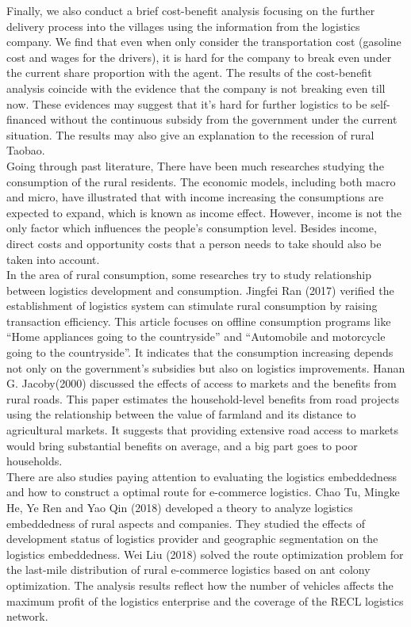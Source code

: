 \documentclass{article}
\begin{document}
\mbox{\hspace{2em}}
Finally, we also conduct a brief cost-benefit analysis focusing on the further delivery process into the villages using the information from the logistics company. We find that even when only consider the transportation cost (gasoline cost and wages for the drivers), it is hard for the company to break even under the current share proportion with the agent. The results of the cost-benefit analysis coincide with the evidence that the company is not breaking even till now. These evidences may suggest that it’s hard for further logistics to be self-financed without the continuous subsidy from the government under the current situation. The results may also give an explanation to the recession of rural Taobao.\\
\mbox{\hspace{2em}}
Going through past literature, There have been much researches studying the consumption of the rural residents. The economic models, including both macro and micro, have illustrated that with income increasing the consumptions are expected to expand, which is known as income effect. However, income is not the only factor which influences the people’s consumption level. Besides income, direct costs and opportunity costs that a person needs to take should also be taken into account.\\
\mbox{\hspace{2em}}
In the area of rural consumption, some researches try to study relationship between logistics development and consumption. Jingfei Ran (2017) verified the establishment of logistics system can stimulate rural consumption by raising transaction efficiency. This article focuses on offline consumption programs like “Home appliances going to the countryside” and “Automobile and motorcycle going to the countryside”. It indicates that the consumption increasing depends not only on the government’s subsidies but also on logistics improvements. Hanan G. Jacoby(2000) discussed the effects of access to markets and the benefits from rural roads. This paper estimates the household-level benefits from road projects using the relationship between the value of farmland and its distance to agricultural markets. It suggests that providing extensive road access to markets would bring substantial benefits on average, and a big part goes to poor households.\\
\mbox{\hspace{2em}}
There are also studies paying attention to evaluating the logistics embeddedness and how to construct a optimal route for e-commerce logistics. Chao Tu, Mingke He, Ye Ren and Yao Qin (2018) developed a theory to analyze logistics embeddedness of rural aspects and companies. They studied the effects of development status of logistics provider and geographic segmentation on the logistics embeddedness. Wei Liu (2018) solved the route optimization problem for the last-mile distribution of rural e-commerce logistics based on ant colony optimization. The analysis results reflect how the number of vehicles affects the maximum profit of the logistics enterprise and the coverage of the RECL logistics network.\\
\end{document}
